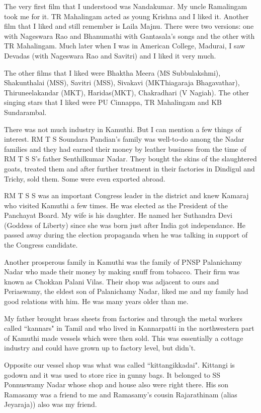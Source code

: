 The very first film that I understood was Nandakumar. My uncle 
Ramalingam took me for it. TR Mahalingam acted as young Krishna and I 
liked it. Another film that I liked and still remember is Laila Majnu. 
There were two versions: one with Nageswara Rao and Bhanumathi with 
Gantasala's songs and the other with TR Mahalingam. Much later when I 
was in American College, Madurai, I saw Devadas (with Nageswara Rao and 
Savitri) and I liked it very much.

The other films that I liked were Bhaktha Meera (MS Subbu\-lakshmi), Shakunthalai (MSS), Savitri (MSS), Sivakavi (MK\break Thiagaraja Bhagavathar), Thiruneelakandar (MKT), Haridas\break (MKT), Chakradhari (V Nagiah). The other singing stars that I liked were PU Cinnappa, TR Mahalingam and KB Sunda\-rambal.

There was not much industry in Kamuthi. But I can mention a few things 
of interest. RM T S Soundara Pandian's family was well-to-do among the 
Nadar families and they had earned their money by leather business from 
the time of RM T S S's father Senthilkumar Nadar. They bought the skins 
of the slaughtered goats, treated them and after further treatment in 
their factories in Dindigul and Trichy, sold them. Some were even 
exported abroad.

RM T S S was an important Congress leader in the district and knew 
Kamaraj who visited Kamuthi a few times. He was elected as the President 
of the Panchayat Board. My wife is his daughter. He named her Suthandra 
Devi (Goddess of Liberty) since she was born just after India got 
independance. He passed away during the election propaganda when he was 
talking in support of the Congress candidate.

Another prosperous family in Kamuthi was the family of PNSP Palanichamy 
Nadar who made their money by making snuff from tobacco. Their firm was 
known as Chokkan Palani Vilas. Their shop was adjacent to ours and 
Periaswamy, the eldest son of Palanichamy Nadar, liked me and my family 
had good relations with him. He was many years older than me.

My father brought brass sheets from factories and through the metal 
workers called ``kannars" in Tamil and who lived in Kannarpatti in the 
northwestern part of Kamuthi made vessels which were then sold. This was 
essentially a cottage industry and could have grown up to factory level, 
but didn't.

Opposite our vessel shop was what was called ``kittangikkadai". Kittangi 
is godown and it was used to store rice in gunny bags. It belonged to SS 
Ponnuswamy Nadar whose shop and house also were right there. His son 
Ramasamy was a friend to me and Ramasamy's cousin Rajarathinam (alias 
Jeyaraja)) also was my friend.

